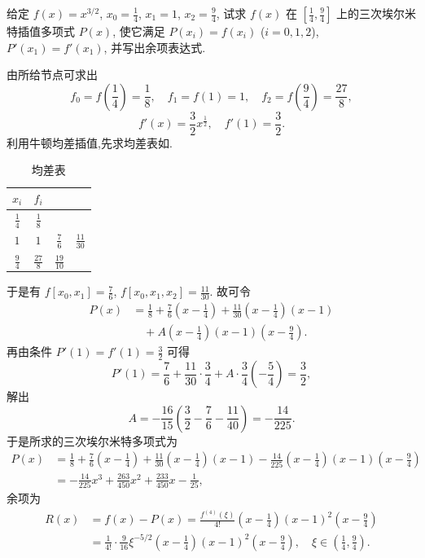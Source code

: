 \documentclass[../../main.tex]{subfiles}%
\begin{document}
\begin{example}
给定 $f(x) = x^{3/2}$, $x_0 = \frac{1}{4}$, $x_1 = 1$, $x_2 = \frac{9}{4}$, 试求 $f(x)$ 在 $\left[ \frac{1}{4}, \frac{9}{4} \right]$ 上的三次埃尔米特插值多项式 $P(x)$, 使它满足 $P(x_i) = f(x_i)$ ($i = 0, 1, 2$), $P'(x_1) = f'(x_1)$, 并写出余项表达式.
\end{example}
\begin{solution}

由所给节点可求出
\[
f_0 = f\left( \frac{1}{4} \right) = \frac{1}{8}, \quad f_1 = f(1) = 1, \quad f_2 = f\left( \frac{9}{4} \right) = \frac{27}{8},
\]
\[
f'(x) = \frac{3}{2} x^{\frac{1}{2}}, \quad f'(1) = \frac{3}{2}.
\]
利用牛顿均差插值,先求均差表如.
\begin{table}[H]
\centering
\caption{均差表}
\label{table:均差表111}
\begin{tabular}{c c c c}
\toprule
$x_i$ & $f_i$ &  &  \\
\midrule
$\frac{1}{4}$ & $\frac{1}{8}$ &  &  \\
$1$ & $1$ & $\frac{7}{6}$ & $\frac{11}{30}$ \\
$\frac{9}{4}$ & $\frac{27}{8}$ & $\frac{19}{10}$ &  \\
\bottomrule
\end{tabular}
\end{table}

于是有 $f[x_0, x_1] = \frac{7}{6}$, $f[x_0, x_1, x_2] = \frac{11}{30}$.
故可令
\begin{align*}
P(x) &= \frac{1}{8} + \frac{7}{6} \left( x - \frac{1}{4} \right) + \frac{11}{30} \left( x - \frac{1}{4} \right)(x - 1) \\
&\quad + A \left( x - \frac{1}{4} \right)(x - 1) \left( x - \frac{9}{4} \right).
\end{align*}
再由条件 $P'(1) = f'(1) = \frac{3}{2}$ 可得
\[
P'(1) = \frac{7}{6} + \frac{11}{30} \cdot \frac{3}{4} + A \cdot \frac{3}{4} \left( -\frac{5}{4} \right) = \frac{3}{2},
\]
解出
\[
A = -\frac{16}{15} \left( \frac{3}{2} - \frac{7}{6} - \frac{11}{40} \right) = -\frac{14}{225}.
\]
于是所求的三次埃尔米特多项式为
\begin{align*}
P(x) &= \frac{1}{8} + \frac{7}{6} \left( x - \frac{1}{4} \right) + \frac{11}{30} \left( x - \frac{1}{4} \right)(x - 1) - \frac{14}{225} \left( x - \frac{1}{4} \right)(x - 1) \left( x - \frac{9}{4} \right) \\
&= -\frac{14}{225} x^3 + \frac{263}{450} x^2 + \frac{233}{450} x - \frac{1}{25},
\end{align*}
余项为
\begin{align*}
R(x) &= f(x) - P(x) = \frac{f^{(4)}(\xi)}{4!} \left( x - \frac{1}{4} \right)(x - 1)^2 \left( x - \frac{9}{4} \right) \\
&= \frac{1}{4!} \cdot \frac{9}{16} \xi^{-5/2} \left( x - \frac{1}{4} \right)(x - 1)^2 \left( x - \frac{9}{4} \right), \quad \xi \in \left( \frac{1}{4}, \frac{9}{4} \right).
\end{align*}

\end{solution}
\end{document}
